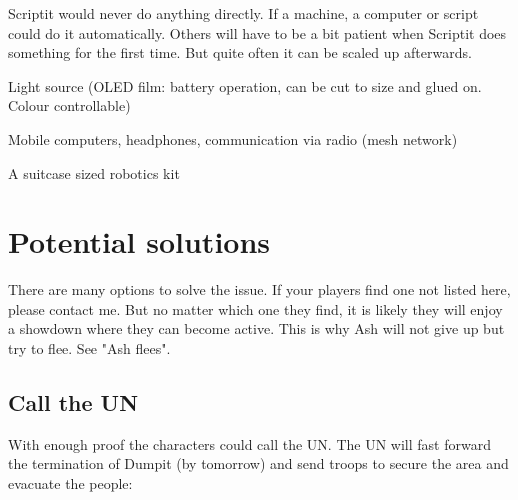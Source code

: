\begin{npcBox}[title=Scriptit - a Pioneer Automationationeer]
    \begin{stressSection}
    \end{stressSection}
    \begin{tabularx}{\textwidth}{ XX }
    \end{tabularx}

    \begin{consequences}
    \item {}
    \item {}
    \item {}
    \end{consequences}

    \begin{npcDescription}
    Scriptit would never do anything directly. If a machine, a computer or script could do it automatically. Others will have to be a bit patient when Scriptit does something for the first time. But quite often it can be scaled up afterwards.

    \end{npcDescription}

    \begin{equipment}
        \item Light source (OLED film: battery operation, can be cut to size and glued on. Colour controllable)
        \item Mobile computers, headphones, communication via radio (mesh network)
        \item A suitcase sized robotics kit
    \end{equipment}
\end{npcBox}

\section{Potential solutions}

There are many options to solve the issue. If your players find one not listed here, please contact me. But no matter which one they find, it is likely they will enjoy a showdown where they can become active. This is why Ash will not give up but try to flee. See "Ash flees".

\subsection{Call the UN}

With enough proof the characters could call the UN. The UN will fast forward the termination of Dumpit (by tomorrow) and send troops to secure the area and evacuate the people:

